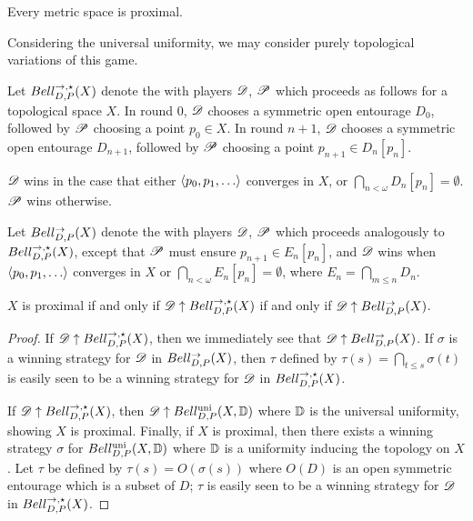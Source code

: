 \begin{prop}
  Every metric space is proximal.
\end{prop}

Considering the universal uniformity, we may
consider purely topological variations of this game.

\begin{game}
  Let $Bell_{D,P}^{\to,\star}(X)$ denote the  with players $\mathscr{D}$,
  $\mathscr{P}$ which proceeds as follows for a topological space $X$. In round $0$,
  $\mathscr{D}$ chooses a symmetric open entourage $D_0$, followed by $\mathscr{P}$
  choosing a point $p_0\in X$. In round $n+1$, $\mathscr{D}$ chooses a symmetric
  open entourage $D_{n+1}$, followed
  by $\mathscr{P}$ choosing a point $p_{n+1}\in D_n[p_n]$.

  $\mathscr{D}$ wins in the case that either $\<p_0,p_1,\dots\>$ converges in $X$,
  or $\bigcap_{n<\omega}D_n[p_n] = \emptyset$. $\mathscr{P}$ wins otherwise.
\end{game}

\begin{game}
  Let $Bell_{D,P}^{\to}(X)$ denote the  with players $\mathscr{D}$,
  $\mathscr{P}$ which proceeds analogously to $Bell_{D,P}^{\to,\star}(X)$, except that
  $\mathscr{P}$ must ensure $p_{n+1}\in E_n[p_n]$,
  and $\mathscr{D}$ wins when $\<p_0,p_1,\dots\>$ converges in $X$
  or $\bigcap_{n<\omega}E_n[p_n] = \emptyset$, where
  $E_n=\bigcap_{m\leq n}D_n$.
\end{game}

\begin{thm}
  $X$ is proximal if and only if $\mathscr{D}\uparrow Bell_{D,P}^{\to,\star}(X)$ if
  and only if $\mathscr{D}\uparrow Bell_{D,P}^{\to}(X)$.
\end{thm}

\begin{proof}
  If $\mathscr{D}\uparrow Bell_{D,P}^{\to,\star}(X)$, then we immediately see that
  $\mathscr{D}\uparrow Bell_{D,P}^{\to}(X)$. If $\sigma$ is a winning strategy for $\mathscr{D}$
  in $Bell_{D,P}^{\to}(X)$, then $\tau$ defined by
  $\tau(s)=\bigcap_{t\leq s}\sigma(t)$ is easily seen to be a winning strategy
  for $\mathscr{D}$ in $Bell_{D,P}^{\to,\star}(X)$.

  If $\mathscr{D}\uparrow Bell_{D,P}^{\to,\star}(X)$, then $\mathscr{D}\uparrow Bell_{D,P}^{\textrm{uni}}(X,\mathbb{D})$
  where $\mathbb{D}$ is the universal uniformity, showing $X$ is proximal.
  Finally, if $X$ is proximal, then there exists a winning strategy $\sigma$
  for $Bell_{D,P}^{\textrm{uni}}(X,\mathbb{D})$ where $\mathbb{D}$ is a uniformity inducing the
  topology on $X$. Let $\tau$ be defined by $\tau(s)=O(\sigma(s))$ where
  $O(D)$ is an open symmetric entourage which is a subset of $D$; $\tau$
  is easily seen to be a winning strategy for $\mathscr{D}$ in $Bell_{D,P}^{\to,\star}(X)$.
\end{proof}

